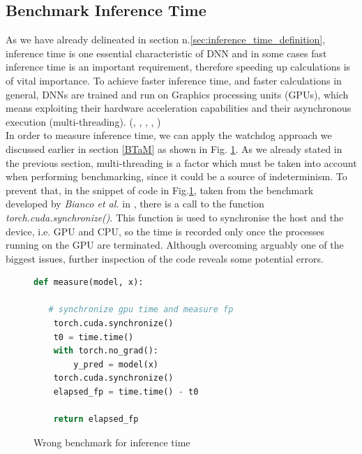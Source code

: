 \subsection{Benchmark Inference Time}\label{sec:ben_inf}
As we have already delineated in section n.\ref{sec:inference_time_definition}, inference time is one essential characteristic of DNN and in some cases fast inference time is an important requirement, therefore speeding up calculations is of vital importance. To achieve faster inference time, and faster calculations in general, DNNs are trained and run on Graphics processing units (GPUs), which means exploiting their hardware acceleration capabilities and their asynchronous execution (multi-threading).  (\cite{8090194}, \cite{10.1007/978-3-642-04274-4_39}, \cite{10.1145/3089801.3089804}, \cite{paine2013gpu}, \cite{OH20041311})\\
In order to measure inference time, we can apply the watchdog approach we discussed earlier in section \ref{BTaM} as shown in Fig. \ref{fig:wrong_inf}. As we already stated in the previous section, multi-threading is a factor which must be taken into account when performing benchmarking, since it could be a source of indeterminism. To prevent that, in the snippet of code in Fig.\ref{fig:wrong_inf}, taken from the benchmark developed by \textit{Bianco et al.} in \cite{bianco2018dnnsbench}, there is a call to the function \textit{torch.cuda.synchronize()}. This function is used to synchronise the host and the device, i.e. GPU and CPU, so the time is recorded only once the processes running on the GPU are terminated. Although overcoming arguably one of the biggest issues, further inspection of the code reveals some potential errors.\\
\begin{figure}[h]
\begin{lstlisting}[language=python]
def measure(model, x):

   # synchronize gpu time and measure fp
	torch.cuda.synchronize()
	t0 = time.time()
	with torch.no_grad():
		y_pred = model(x)
	torch.cuda.synchronize()
	elapsed_fp = time.time() - t0
	
	return elapsed_fp

\end{lstlisting}
\caption[Wrong benchmark for inference time]{Wrong benchmark for inference time \cite{bianco2018dnnsbench}}
\label{fig:wrong_inf}
\end{figure}




